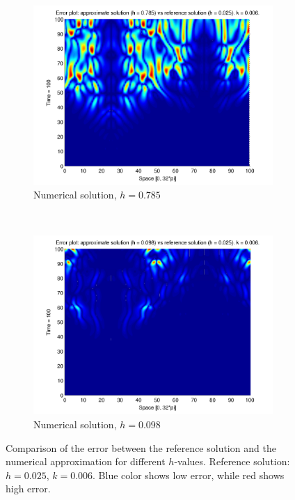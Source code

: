 \begin{figure}[H]
        \centering
        \begin{subfigure}[b]{0.52\textwidth}
                \includegraphics[width=\textwidth]{PDFs/IMEX/error_num_ref_t100_3rd.pdf}
                \caption{Numerical solution, $h = 0.785$}
                \label{fig:highError}
        \end{subfigure}%
        ~ %
        \begin{subfigure}[b]{0.52\textwidth}
                \includegraphics[width=\textwidth]{PDFs/IMEX/error_num_ref_t100_1st.pdf}
                \caption{Numerical solution, $h = 0.098$}
                \label{fig:lowError}
        \end{subfigure}
        \caption{Comparison of the error between the reference solution and the numerical approximation for different $h$-values. Reference solution: $h = 0.025$, $k = 0.006$. Blue color shows low error, while red shows high error.}\label{fig:errPlots}
\end{figure}

